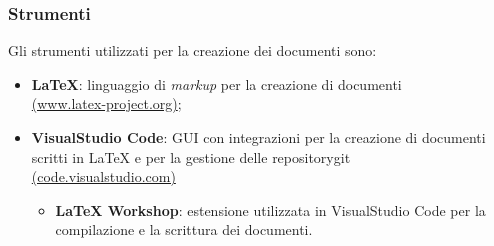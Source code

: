 \subsubsection{Strumenti}
Gli strumenti utilizzati per la creazione dei documenti sono:
\begin{itemize}
	\item \textbf{LaTeX}: linguaggio di \textit{markup} per la creazione di
	      documenti \\
	      \href{https://www.latex-project.org/}{(www.latex-project.org)};
	\item \textbf{VisualStudio Code}: GUI con integrazioni per la creazione di
	      documenti scritti in LaTeX e per la gestione delle repository\g git\g \\
	      \href{https://code.visualstudio.com/}{(code.visualstudio.com)}
	      \begin{itemize}
		      \item \textbf{LaTeX Workshop}: estensione utilizzata in
		            VisualStudio Code per la compilazione e la scrittura dei
		            documenti.
	      \end{itemize}
\end{itemize}
